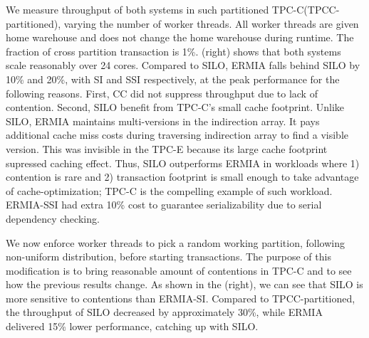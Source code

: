 We measure throughput of both systems in such partitioned TPC-C(TPCC-partitioned), varying the number of worker threads. All worker threads are given home warehouse and does not change the home warehouse during runtime. The fraction of cross partition transaction is 1\%. (right) shows that both systems scale reasonably over 24 cores. Compared to SILO, ERMIA falls behind SILO by 10\% and 20\%, with SI and SSI respectively, at the peak performance for the following reasons. First, CC did not suppress throughput due to lack of contention. Second, SILO benefit from TPC-C's small cache footprint. Unlike SILO, ERMIA maintains multi-versions in the indirection array. It pays additional cache miss costs during traversing indirection array to find a visible version. This was invisible in the TPC-E because its large cache footprint supressed caching effect. Thus, SILO outperforms ERMIA in workloads where 1) contention is rare and 2) transaction footprint is small enough to take advantage of cache-optimization; TPC-C is the compelling example of such workload. ERMIA-SSI had extra 10\% cost to guarantee serializability due to serial dependency checking.

We now enforce worker threads to pick a random working partition, following non-uniform distribution, before starting transactions. The purpose of this modification is to bring reasonable amount of contentions in TPC-C and to see how the previous results change. As shown in the (right), we can see that SILO is more sensitive to contentions than ERMIA-SI. Compared to TPCC-partitioned, the throughput of SILO decreased by approximately 30\%, while ERMIA delivered 15\% lower performance, catching up with SILO.
%
